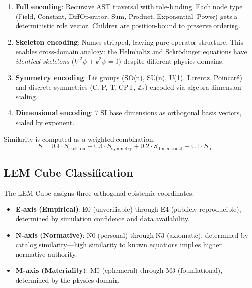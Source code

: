 \documentclass[letterpaper,11pt]{article}
\begin{document}
\begin{enumerate}
\item \textbf{Full encoding}: Recursive AST traversal with role-binding.
      Each node type (Field, Constant, DiffOperator, Sum, Product, Exponential,
      Power) gets a deterministic role vector. Children are position-bound to
      preserve ordering.

\item \textbf{Skeleton encoding}: Names stripped, leaving pure operator
      structure. This enables cross-domain analogy: the Helmholtz and
      Schr\"odinger equations have \emph{identical skeletons} ($\nabla^2\psi +
      k^2\psi = 0$) despite different physics domains.

\item \textbf{Symmetry encoding}: Lie groups (SO(n), SU(n), U(1), Lorentz,
      Poincar\'e) and discrete symmetries (C, P, T, CPT, $\mathbb{Z}_2$)
      encoded via algebra dimension scaling.

\item \textbf{Dimensional encoding}: 7 SI base dimensions as orthogonal
      basis vectors, scaled by exponent.
\end{enumerate}

Similarity is computed as a weighted combination:
\begin{equation}
S = 0.4 \cdot S_{\text{skeleton}} + 0.3 \cdot S_{\text{symmetry}} + 0.2 \cdot S_{\text{dimensional}} + 0.1 \cdot S_{\text{full}}
\end{equation}

\subsection{LEM Cube Classification}

The LEM Cube assigns three orthogonal epistemic coordinates:

\begin{itemize}
\item \textbf{E-axis (Empirical)}: E0 (unverifiable) through E4 (publicly
      reproducible), determined by simulation confidence and data availability.
\item \textbf{N-axis (Normative)}: N0 (personal) through N3 (axiomatic),
      determined by catalog similarity---high similarity to known equations
      implies higher normative authority.
\item \textbf{M-axis (Materiality)}: M0 (ephemeral) through M3 (foundational),
      determined by the physics domain.
\end{itemize}
\end{document}
